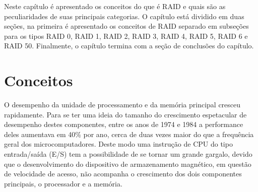 Neste capítulo é apresentado os conceitos do que é RAID e quais são as peculiaridades de suas principais categorias. O capítulo está dividido em duas seções, na primeira é apresentado os conceitos de RAID separado em subseções para os tipos RAID 0, RAID 1, RAID 2, RAID 3, RAID 4, RAID 5, RAID 6 e RAID 50. Finalmente, o capítulo termina com a seção de conclusões do capítulo.

		\section{Conceitos}
		O desempenho da unidade de processamento e da memória principal cresceu rapidamente. Para se ter uma ideia do tamanho do crescimento espetacular de desempenho destes componentes, entre os anos de 1974 e 1984 a performance deles aumentava em 40\% por ano, cerca de duas vezes maior do que a frequência geral dos microcomputadores. Deste modo uma instrução de CPU do tipo entrada/saída (E/S) tem a possibilidade de se tornar um grande gargalo, devido que o desenvolvimento do dispositivo de armazenamento magnético, em questão de velocidade de acesso, não acompanha o crescimento dos dois componentes principais, o processador e a memória.\\
		
